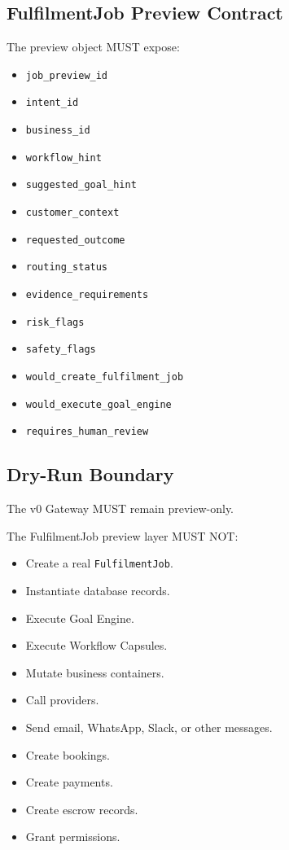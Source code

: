\subsection{FulfilmentJob Preview Contract}

The preview object MUST expose:

\begin{itemize}
  \item \texttt{job\_preview\_id}
  \item \texttt{intent\_id}
  \item \texttt{business\_id}
  \item \texttt{workflow\_hint}
  \item \texttt{suggested\_goal\_hint}
  \item \texttt{customer\_context}
  \item \texttt{requested\_outcome}
  \item \texttt{routing\_status}
  \item \texttt{evidence\_requirements}
  \item \texttt{risk\_flags}
  \item \texttt{safety\_flags}
  \item \texttt{would\_create\_fulfilment\_job}
  \item \texttt{would\_execute\_goal\_engine}
  \item \texttt{requires\_human\_review}
\end{itemize}

\subsection{Dry-Run Boundary}

The v0 Gateway MUST remain preview-only.

The FulfilmentJob preview layer MUST NOT:

\begin{itemize}
  \item Create a real \texttt{FulfilmentJob}.
  \item Instantiate database records.
  \item Execute Goal Engine.
  \item Execute Workflow Capsules.
  \item Mutate business containers.
  \item Call providers.
  \item Send email, WhatsApp, Slack, or other messages.
  \item Create bookings.
  \item Create payments.
  \item Create escrow records.
  \item Grant permissions.
\end{itemize}

